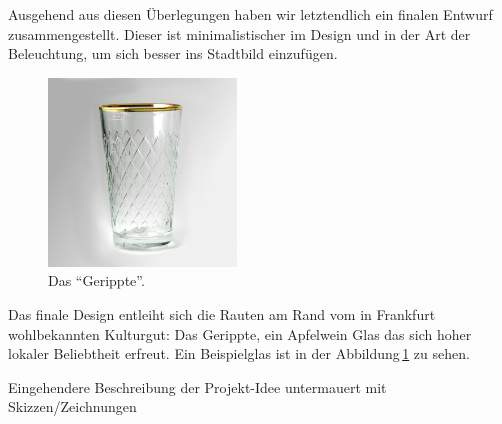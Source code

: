     Ausgehend aus diesen Überlegungen haben wir letztendlich ein finalen Entwurf zusammengestellt. Dieser ist minimalistischer im Design und in der Art der Beleuchtung, um sich besser ins Stadtbild einzufügen.


    \begin{figure}[H]
        \centering
        \includegraphics[width=5cm]{media/01_project/picture_geripptes.jpg}
        \caption{Das \enquote{Gerippte}.}
        \label{fig:picture_gerippte}
    \end{figure}


    Das finale  Design entleiht sich die Rauten am Rand vom in Frankfurt wohlbekannten Kulturgut: Das Gerippte, ein Apfelwein Glas das sich hoher lokaler Beliebtheit  erfreut. Ein Beispielglas ist in der Abbildung\,\ref{fig:picture_gerippte} zu sehen.

    Eingehendere Beschreibung der Projekt-Idee untermauert mit
    Skizzen/Zeichnungen
    
